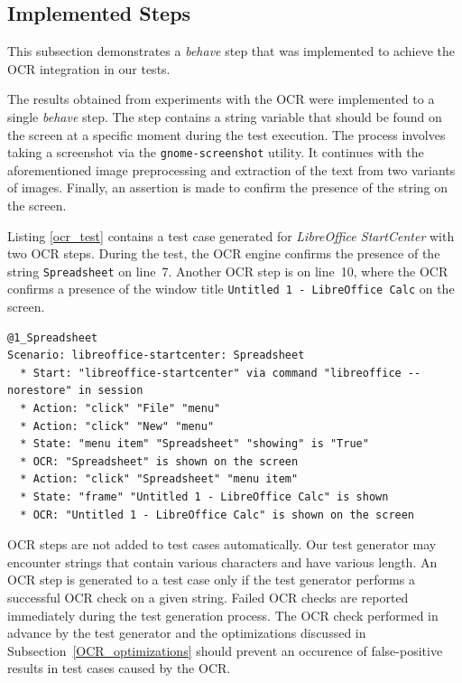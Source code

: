 \subsection{Implemented Steps}\label{OCR_steps}
This subsection demonstrates a \textit{behave} step that was implemented to achieve the OCR integration in our tests. 

The results obtained from experiments with the OCR were implemented to a single \textit{behave} step. The step contains a string variable that should be found on the screen at a specific moment during the test execution. The process involves taking a screenshot via the \texttt{gnome-screenshot} utility. It continues with the aforementioned image preprocessing and extraction of the text from two variants of images. Finally, an assertion is made to confirm the presence of the string on the screen. 

Listing \ref{ocr_test} contains a test case generated for \textit{LibreOffice StartCenter} with two OCR steps. During the test, the OCR engine confirms the presence of the string \texttt{Spreadsheet} on line~7. Another OCR step is on line~10, where the OCR confirms a presence of the window title \texttt{Untitled 1 - LibreOffice Calc} on the screen.

\begin{lstlisting}[language=Gherkin,caption={
A test case demonstrating the integration of OCR into test cases},label={ocr_test}, float]
@1_Spreadsheet
Scenario: libreoffice-startcenter: Spreadsheet
  * Start: "libreoffice-startcenter" via command "libreoffice --norestore" in session
  * Action: "click" "File" "menu"
  * Action: "click" "New" "menu"
  * State: "menu item" "Spreadsheet" "showing" is "True"
  * OCR: "Spreadsheet" is shown on the screen
  * Action: "click" "Spreadsheet" "menu item"
  * State: "frame" "Untitled 1 - LibreOffice Calc" is shown
  * OCR: "Untitled 1 - LibreOffice Calc" is shown on the screen
\end{lstlisting}

OCR steps are not added to test cases automatically. Our test generator may encounter strings that contain various characters and have various length. An OCR step is generated to a test case only if the test generator performs a successful OCR check on a given string. Failed OCR checks are reported immediately during the test generation process. The OCR check performed in advance by the test generator and the optimizations discussed in Subsection~\ref{OCR_optimizations} should prevent an occurence of false-positive results in test cases caused by the OCR.

